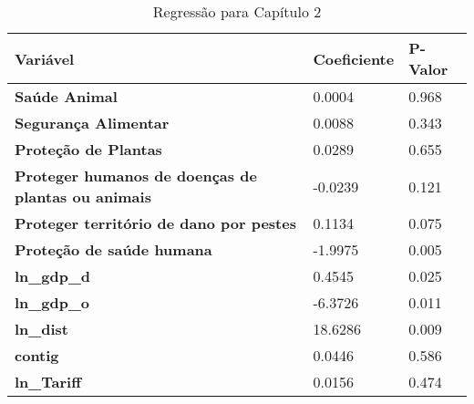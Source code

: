 \begin{table}[h]
    \begin{tabular}{@{}l|l|l@{}}
    \toprule
    \textbf{Variável}                                          & \textbf{Coeficiente} & \textbf{P-Valor} \\ \midrule
    \textbf{Saúde Animal}                                      & 0.0004               & 0.968            \\ \midrule
    \textbf{Segurança Alimentar}                               & 0.0088               & 0.343            \\ \midrule
    \textbf{Proteção de Plantas}                               & 0.0289               & 0.655            \\ \midrule
    \textbf{Proteger humanos de doenças de plantas ou animais} & -0.0239              & 0.121            \\ \midrule
    \textbf{Proteger território de dano por pestes}            & 0.1134               & 0.075            \\ \midrule
    \textbf{Proteção de saúde humana}                          & -1.9975              & 0.005            \\ \midrule
    \textbf{ln\_gdp\_d}                                        & 0.4545               & 0.025            \\ \midrule
    \textbf{ln\_gdp\_o}                                        & -6.3726              & 0.011            \\ \midrule
    \textbf{ln\_dist}                                          & 18.6286              & 0.009            \\ \midrule
    \textbf{contig}                                            & 0.0446               & 0.586            \\ \midrule
    \textbf{ln\_Tariff}                                        & 0.0156               & 0.474            \\ \bottomrule
    \end{tabular}
\caption{Regressão para Capítulo 2}
\end{table}